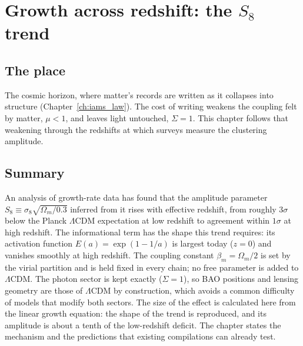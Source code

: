 \chapter{Growth across redshift: the $S_8$ trend}\label{ch:s8trend}

\section*{The place}
The cosmic horizon, where matter's records are written as it collapses into structure (Chapter~\ref{ch:iams_law}). The cost of writing weakens the
coupling felt by matter, $\mu<1$, and leaves light untouched, $\Sigma=1$. This chapter follows that weakening through the redshifts at which surveys
measure the clustering amplitude.

\section*{Summary}
An analysis of growth-rate data has found that the amplitude parameter $S_8\equiv\sigma_8\sqrt{\Omega_m/0.3}$ inferred from it rises with effective
redshift, from roughly $3\sigma$ below the Planck $\Lambda$CDM expectation at low redshift to agreement within $1\sigma$ at high redshift. The
informational term has the shape this trend requires: its activation function $E(a)=\exp(1-1/a)$ is largest today ($z=0$) and vanishes smoothly at
high redshift. The coupling constant $\beta_m=\Omega_m/2$ is set by the virial partition and is held fixed in every chain; no free parameter is added to
$\Lambda$CDM. The photon sector is kept exactly ($\Sigma=1$), so BAO positions and lensing geometry are those of $\Lambda$CDM by construction, which
avoids a common difficulty of models that modify both sectors. The size of the effect is calculated here from the linear growth equation: the shape of
the trend is reproduced, and its amplitude is about a tenth of the low-redshift deficit. The chapter states the mechanism and the predictions that
existing compilations can already test.

